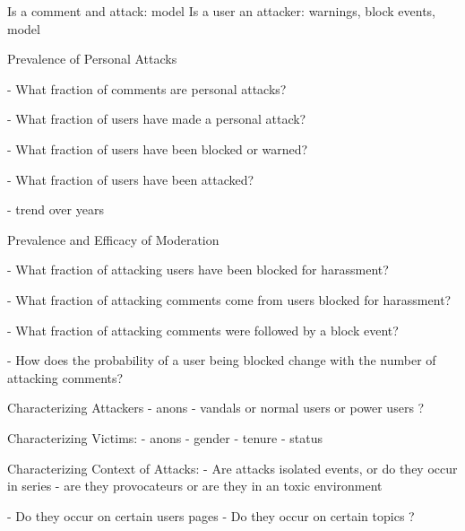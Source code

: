 
Is a comment and attack: model
Is a user an attacker: warnings, block events, model



Prevalence of Personal Attacks


- What fraction of comments are personal attacks?

- What fraction of users have made a personal attack?

- What fraction of users have been blocked or warned?

- What fraction of users have been attacked?

- trend over years



Prevalence and Efficacy of Moderation

- What fraction of attacking users have been blocked for harassment?

- What fraction of attacking comments come from users blocked for harassment?

- What fraction of attacking comments were followed by a block event?

- How does the probability of a user being blocked change with the number of attacking comments?


Characterizing Attackers
- anons 
- vandals or normal users or power users ? 


Characterizing Victims:
 - anons
 - gender
 - tenure
 - status


Characterizing Context of Attacks:
 - Are attacks isolated events, or do they occur in series
 - are they provocateurs or are they in an toxic environment

 - Do they occur on certain users pages
 - Do they occur on certain topics ?








